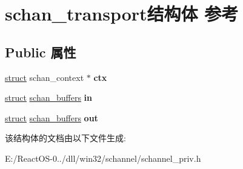 \hypertarget{structschan__transport}{}\section{schan\+\_\+transport结构体 参考}
\label{structschan__transport}
\subsection*{Public 属性}
\begin{DoxyCompactItemize}
\item 
\mbox{\label{structschan__transport_a5ddf5434dc6fad251aa8e94d1656dee9}} 
\hyperlink{interfacestruct}{struct} schan\+\_\+context $\ast$ {\bfseries ctx}
\item 
\mbox{\label{structschan__transport_a24dd2a0f64ddc4a67afc6b50b3519ca4}} 
\hyperlink{interfacestruct}{struct} \hyperlink{structschan__buffers}{schan\+\_\+buffers} {\bfseries in}
\item 
\mbox{\label{structschan__transport_a0ccb9457ac8540f1d2a78846491aa786}} 
\hyperlink{interfacestruct}{struct} \hyperlink{structschan__buffers}{schan\+\_\+buffers} {\bfseries out}
\end{DoxyCompactItemize}


该结构体的文档由以下文件生成\+:\begin{DoxyCompactItemize}
\item 
E\+:/\+React\+O\+S-\/0../dll/win32/schannel/schannel\+\_\+priv.\+h\end{DoxyCompactItemize}
